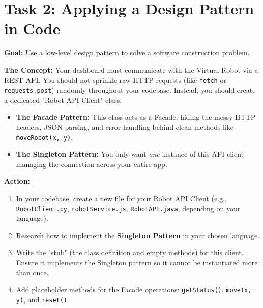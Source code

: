 \documentclass[a4paper,12pt]{article}
\begin{document}
 


\section*{Task 2: Applying a Design Pattern in Code}

\textbf{Goal:} Use a low-level design pattern to solve a software construction problem.

\textbf{The Concept:} Your dashboard must communicate with the Virtual Robot via a REST API. You should not sprinkle raw HTTP requests (like \texttt{fetch} or \texttt{requests.post}) randomly throughout your codebase. Instead, you should create a dedicated "Robot API Client" class.
\begin{itemize}
    \item \textbf{The Facade Pattern:} This class acts as a Facade, hiding the messy HTTP headers, JSON parsing, and error handling behind clean methods like \texttt{moveRobot(x, y)}.
    \item \textbf{The Singleton Pattern:} You only want \textit{one} instance of this API client managing the connection across your entire app.
\end{itemize}

\vspace{0.3cm}
\textbf{Action:}
\begin{enumerate}
    \item In your codebase, create a new file for your Robot API Client (e.g., \texttt{RobotClient.py}, \texttt{robotService.js}, \texttt{RobotAPI.java}, depending on your language).
    \item Research how to implement the \textbf{Singleton Pattern} in your chosen language. 
    \item Write the "stub" (the class definition and empty methods) for this client. Ensure it implements the Singleton pattern so it cannot be instantiated more than once.
    \item Add placeholder methods for the Facade operations: \texttt{getStatus()}, \texttt{move(x, y)}, and \texttt{reset()}.
\end{enumerate}

\end{document}
